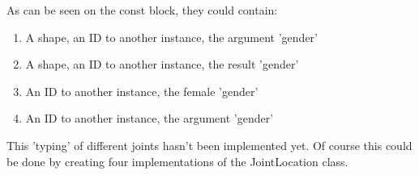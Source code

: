 \documentclass[10pt]{extarticle} %
\begin{document}
    As can be seen on the const block, they could contain:
    \begin{enumerate}
        \item A shape, an ID to another instance, the argument 'gender'
        \item A shape, an ID to another instance, the result 'gender'
        \item An ID to another instance, the female 'gender'
        \item An ID to another instance, the argument 'gender'
    \end{enumerate}
    This 'typing' of different joints hasn't been implemented yet.
    Of course this could be done by creating four implementations of the JointLocation class.


    \newpage
    
    
\end{document}
